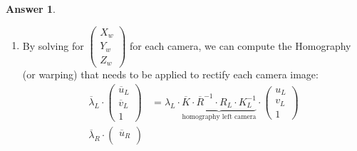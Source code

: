 \documentclass[a4paper,12 pt]{article}
\theoremstyle{definition}
\theoremstyle{remark}
\theoremstyle{definition}
\theoremstyle{definition}
\theoremstyle{definition}
\theoremstyle{definition}
\theoremstyle{remark}
\theoremstyle{remark}
\theoremstyle{definition}
\theoremstyle{definition}
\newtheorem*{answer}{Answer}
\begin{document}
\begin{enumerate}
\begin{answer}
\begin{enumerate}
\begin{equation}
\begin{split}
\begin{pmatrix}
 X_w\\
 Y_w\\
 Z_w
 \end{pmatrix}-C_L\right) \\
 \lambda_R\cdot \begin{pmatrix}
 u_R\\
 v_R\\
 1
 \end{pmatrix}&= K_R\cdot R_R^{-1}\cdot \left(\begin{pmatrix}
 X_w\\
 Y_w\\
 Z_w
 \end{pmatrix}-C_R\right) \rightarrow \overline{\lambda}_R\cdot \begin{pmatrix}
 \overline{u}_R\\
 \overline{v}_R\\
 1
 \end{pmatrix}= \overline{K}\cdot \overline{R}^{-1}\cdot \left(\begin{pmatrix}
 X_w\\
 Y_w\\
 Z_w
 \end{pmatrix}-C_R\right) 
\end{split}
\end{equation}
\item By solving for $\begin{pmatrix}
 X_w\\
 Y_w\\
 Z_w \end{pmatrix}$ for each camera, we can compute the Homography (or warping) that needs to be applied to rectify each camera image:
\begin{equation}
\begin{split}
\overline{\lambda}_L\cdot \begin{pmatrix}
 \overline{u}_L\\
 \overline{v}_L\\
 1
 \end{pmatrix}&=\lambda_L \cdot \underbrace{\overline{K}\cdot \overline{R}^{-1} \cdot R_L \cdot K_L^{-1}}_{\text{homography left camera}} \cdot \begin{pmatrix}
 u_L\\
 v_L\\
 1
 \end{pmatrix}\\
 \overline{\lambda}_R\cdot \begin{pmatrix}
 \overline{u}_R\\

\end{pmatrix}
\end{split}
\end{equation}
\end{enumerate}
\end{answer}
\end{enumerate}
\end{document}
